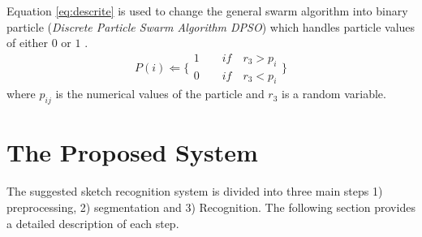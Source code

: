 \documentclass{article}
\begin{document}
Equation \ref{eq:descrite} is used to change the general swarm algorithm into binary particle (\textit{Discrete Particle Swarm Algorithm DPSO}) which handles particle values of either $0$ or $1$ \cite{PSODisceret}.  
\begin{equation}
   P(i)\Leftarrow 
\{
\begin{array}{c} 
1 \quad \quad if\quad r_{3}>p_{i}  \\

0 \quad \quad if\quad r_{3}<p_{i} 
\label{eq:descrite}
\end{array}\}
\end{equation}
 where $p_{ij}$ is the numerical values of the particle and $r_{3}$ is a random variable. 


\section{The Proposed System}
\label{Sysdisc}
 The suggested sketch recognition system is divided into three main steps 1) preprocessing, 2) segmentation and 3) Recognition. The following section provides a detailed description of each step.
 
\end{document}

